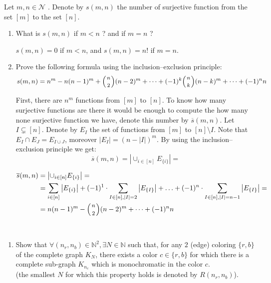 \documentclass[a4paper,11pt]{exam}
\renewcommand{\binom}{\mbinom}
\newcommand{\N}{\mathcal N}
\begin{document}
\begin{questions}
		\question
		Let $m,n\in\N$ . Denote by $s(m,n)$ the number of surjective function from the set $[m]$ to the set $[n]$.
		\begin{enumerate}
			\item What is $s(m,n)$ if $m < n$ ? and if $m = n$ ?
			
			\begin{solution}
				$s(m,n)=0$ if $m < n$, and $s(m,n)=n!$ if $m=n$. 
			\end{solution}
			
			\item Prove the following formula using the inclusion–exclusion principle:
			\[
			s(m,n) = n^m -n(n-1)^m + \binom{n}{2}(n-2)^m + \dots +
			(-1)^k\binom{n}{k}(n-k)^m + \dots + (-1)^n n
			\]
			
			\begin{solution}
				First, there are $n^m$ functions from $[m]$ to $[n]$. To know how many surjective functions are there it would be enough to compute the how many none surjective function we have, denote this number by $\overline{s}(m,n)$. 
				Let $I\subsetneq [n]$. Denote by $E_I$ the set of functions from $[m]$ to $[n]\setminus  I$. Note that $E_I\cap E_J = E_{I\cup J}$, moreover $|E_I|=(n-|I|)^m$. By using the inclusion–exclusion principle we get:
				\[
					\overline{s}(m,n) = \left| \cup_{i\in[n]}E_{\{i\}} \right|= 
				\] 
				
				\begin{align*}
				\overline{s}(m,n) & =\left|\cup_{i\in[n]}E_{\{i\}}\right|=\\
				& =\sum_{i\in[n]}\left|E_{\{i\}}\right|+(-1)^{1}\cdot\sum_{I\in[n],|I|=2}\left|E_{\{I\}}\right|+\ldots+(-1)^{n}\cdot\sum_{I\in[n],|I|=n-1}\left|E_{\{I\}}\right|=\\
				& =n(n-1)^{m}-\binom{n}{2}(n-2)^{m}+\dots+(-1)^{n}n
				\end{align*}
			\end{solution}
		\end{enumerate}
		
		~\vspace{-0.6cm}
		\begin{enumerate}
			\item Show that $\forall (n_r,n_b)\in\mathbb{N}^2, \exists N\in\mathbb{N}$
			such that, for any $2$ (edge) coloring $\{r,b\}$ of the complete graph
			$K_N$, there exists a color $c\in\{r,b\}$ for which there is a complete sub-graph $K_{n_c}$ which is monochromatic in the color $c$.
			\\
			(the smallest $N$ for which this property holds is denoted by $R(n_r,n_b)$).
			

\end{enumerate}
\end{questions}
\end{document}
